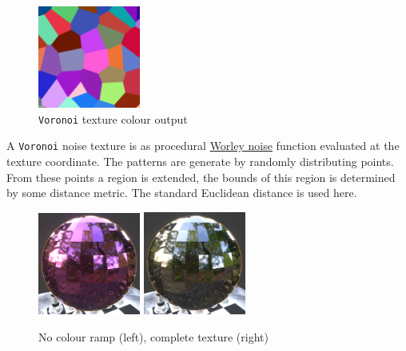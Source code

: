 \documentclass[11pt]{article}
\begin{document}
\begin{figure}[htbp]
\centering
\includegraphics[width=0.3\textwidth]{Images/render_shader-nodes_textures_voronoi_smoothness-color-zero.png}
\caption{\texttt{Voronoi} texture colour output}
\end{figure}
A \texttt{Voronoi} noise texture is as procedural \href{https://en.wikipedia.org/wiki/Worley\_noise}{Worley noise} function evaluated at the texture
coordinate. The patterns are generate by randomly distributing points. From
these points a region is extended, the bounds of this region is determined by
some distance metric. The standard Euclidean distance is used here.

\begin{figure}[htbp]
\begin{center}
\includegraphics[width=0.3\textwidth]{Images/Purple.png}
\includegraphics[width=0.3\textwidth]{Images/discoclose.png}
\end{center}
\caption{No colour ramp (left), complete texture (right)}
\end{figure}
\end{document}
